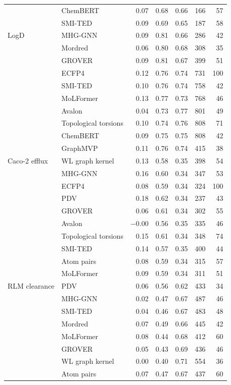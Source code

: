\begin{longtable}{llrrrrr}
 & ChemBERT & 0.07 & 0.68 & 0.66 & 166 & 57 \\
 & SMI-TED & 0.09 & 0.69 & 0.65 & 187 & 58 \\
\midrule
LogD & MHG-GNN & 0.09 & 0.81 & 0.66 & 286 & 42 \\
 & Mordred & 0.06 & 0.80 & 0.68 & 308 & 35 \\
 & GROVER & 0.09 & 0.81 & 0.67 & 399 & 51 \\
 & ECFP4 & 0.12 & 0.76 & 0.74 & 731 & 100 \\
 & SMI-TED & 0.10 & 0.76 & 0.74 & 758 & 42 \\
 & MoLFormer & 0.13 & 0.77 & 0.73 & 768 & 46 \\
 & Avalon & 0.04 & 0.73 & 0.77 & 801 & 49 \\
 & Topological torsions & 0.10 & 0.74 & 0.76 & 808 & 71 \\
 & ChemBERT & 0.09 & 0.75 & 0.75 & 808 & 42 \\
 & GraphMVP & 0.11 & 0.76 & 0.74 & 415 & 38 \\
\midrule
Caco-2 efflux & WL graph kernel & 0.13 & 0.58 & 0.35 & 398 & 54 \\
 & MHG-GNN & 0.16 & 0.60 & 0.34 & 347 & 53 \\
 & ECFP4 & 0.08 & 0.59 & 0.34 & 324 & 100 \\
 & PDV & 0.18 & 0.62 & 0.34 & 237 & 43 \\
 & GROVER & 0.06 & 0.61 & 0.34 & 302 & 55 \\
 & Avalon & $-0.00$ & 0.56 & 0.35 & 335 & 46 \\
 & Topological torsions & 0.15 & 0.61 & 0.34 & 348 & 74 \\
 & SMI-TED & 0.14 & 0.57 & 0.35 & 400 & 44 \\
 & Atom pairs & 0.08 & 0.59 & 0.34 & 315 & 57 \\
 & MoLFormer & 0.09 & 0.59 & 0.34 & 311 & 51 \\
\midrule
RLM clearance & PDV & 0.06 & 0.56 & 0.62 & 433 & 34 \\
 & MHG-GNN & 0.02 & 0.47 & 0.67 & 487 & 46 \\
 & SMI-TED & 0.04 & 0.46 & 0.67 & 483 & 48 \\
 & Mordred & 0.07 & 0.49 & 0.66 & 445 & 42 \\
 & MoLFormer & 0.08 & 0.44 & 0.68 & 412 & 60 \\
 & GROVER & 0.05 & 0.43 & 0.69 & 436 & 46 \\
 & WL graph kernel & 0.00 & 0.40 & 0.71 & 554 & 36 \\
 & Atom pairs & 0.07 & 0.47 & 0.67 & 437 & 60 \\

\end{longtable}
